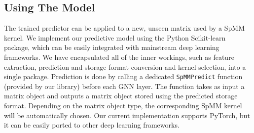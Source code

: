 \vspace{-3mm}
\subsection{Using The Model\label{sec:deployment}}
\vspace{-2mm} The trained predictor can be applied to a new, unseen matrix used by a SpMM kernel. We implement our predictive model using
the Python Scikit-learn \cite{sklearn_api} package, which can be easily integrated with mainstream deep learning frameworks. We have
encapsulated all of the inner workings, such as feature extraction, prediction and storage format conversion and kernel selection, into a
single package. Prediction is done by calling a dedicated \texttt{SpMMPredict} function (provided by our library) before each GNN layer.
The function takes as input a matrix object and outputs a matrix object stored using the predicted storage format. Depending on the matrix
object type, the corresponding SpMM kernel will be automatically chosen. Our current implementation supports PyTorch, but it can be easily
ported to other deep learning frameworks.
